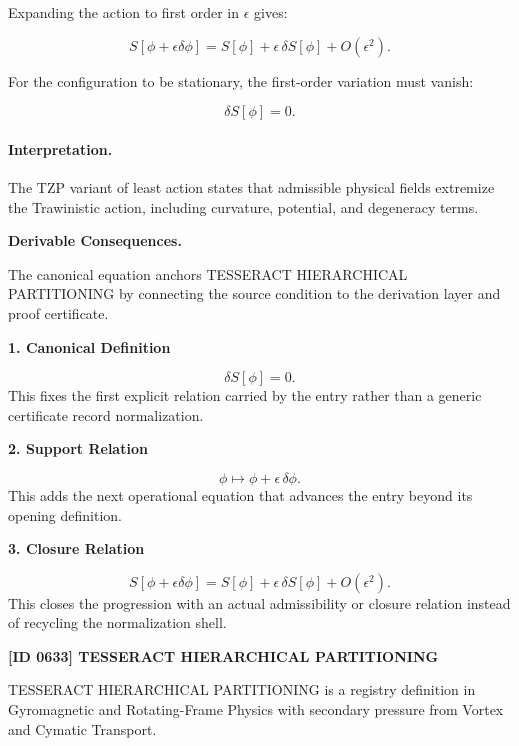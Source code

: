 Expanding the action to first order in $\epsilon$ gives:

\begin{equation}
S[\phi+\epsilon\delta\phi]
=
S[\phi]
+
\epsilon\,\delta S[\phi]
+
O(\epsilon^2).
\end{equation}

For the configuration to be stationary, the first-order variation must vanish:

\begin{equation}
\boxed{
\delta S[\phi]=0 .
}
\end{equation}

\paragraph{Interpretation.}
The TZP variant of least action states that admissible physical fields extremize the Trawinistic action, including curvature, potential, and degeneracy terms.

\par\vspace{0.35em}
\noindent\textbf{Derivable Consequences.}\quad
\begingroup
\footnotesize
\raggedright
The canonical equation anchors TESSERACT HIERARCHICAL PARTITIONING by connecting the source condition to the derivation layer and proof certificate.
\par\endgroup

\noindent\textbf{1. Canonical Definition}\par
\[
\delta S[\phi]=0.
\]
\noindent This fixes the first explicit relation carried by the entry rather than a generic certificate record normalization.\par
\noindent\textbf{2. Support Relation}\par
\[
\phi \mapsto \phi+\epsilon\,\delta\phi.
\]
\noindent This adds the next operational equation that advances the entry beyond its opening definition.\par
\noindent\textbf{3. Closure Relation}\par
\[
S[\phi+\epsilon\delta\phi] = S[\phi] + \epsilon\,\delta S[\phi] + O(\epsilon^2).
\]
\noindent This closes the progression with an actual admissibility or closure relation instead of recycling the normalization shell.\par

\clearpage
\noindent\textbf{[ID 0633] TESSERACT HIERARCHICAL PARTITIONING}\par
\vspace{0.35em}
\begingroup\small
{}
TESSERACT HIERARCHICAL PARTITIONING is a registry definition in Gyromagnetic and Rotating-Frame Physics with secondary pressure from Vortex and Cymatic Transport.


